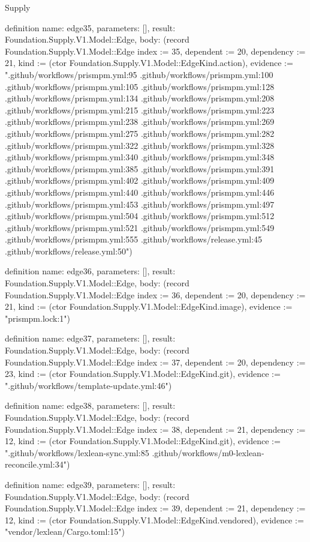 \begin{lexlean}{Supply}
\begin{semanticmodule}
definition{
  name: edge35,
  parameters: [],
  result: Foundation.Supply.V1.Model::Edge,
  body: (record Foundation.Supply.V1.Model::Edge {index := 35, dependent := 20, dependency := 21, kind := (ctor Foundation.Supply.V1.Model::EdgeKind.action), evidence := ".github/workflows/prismpm.yml:95 .github/workflows/prismpm.yml:100 .github/workflows/prismpm.yml:105 .github/workflows/prismpm.yml:128 .github/workflows/prismpm.yml:134 .github/workflows/prismpm.yml:208 .github/workflows/prismpm.yml:215 .github/workflows/prismpm.yml:223 .github/workflows/prismpm.yml:238 .github/workflows/prismpm.yml:269 .github/workflows/prismpm.yml:275 .github/workflows/prismpm.yml:282 .github/workflows/prismpm.yml:322 .github/workflows/prismpm.yml:328 .github/workflows/prismpm.yml:340 .github/workflows/prismpm.yml:348 .github/workflows/prismpm.yml:385 .github/workflows/prismpm.yml:391 .github/workflows/prismpm.yml:402 .github/workflows/prismpm.yml:409 .github/workflows/prismpm.yml:440 .github/workflows/prismpm.yml:446 .github/workflows/prismpm.yml:453 .github/workflows/prismpm.yml:497 .github/workflows/prismpm.yml:504 .github/workflows/prismpm.yml:512 .github/workflows/prismpm.yml:521 .github/workflows/prismpm.yml:549 .github/workflows/prismpm.yml:555 .github/workflows/release.yml:45 .github/workflows/release.yml:50"})
}

definition{
  name: edge36,
  parameters: [],
  result: Foundation.Supply.V1.Model::Edge,
  body: (record Foundation.Supply.V1.Model::Edge {index := 36, dependent := 20, dependency := 21, kind := (ctor Foundation.Supply.V1.Model::EdgeKind.image), evidence := "prismpm.lock:1"})
}

definition{
  name: edge37,
  parameters: [],
  result: Foundation.Supply.V1.Model::Edge,
  body: (record Foundation.Supply.V1.Model::Edge {index := 37, dependent := 20, dependency := 23, kind := (ctor Foundation.Supply.V1.Model::EdgeKind.git), evidence := ".github/workflows/template-update.yml:46"})
}

definition{
  name: edge38,
  parameters: [],
  result: Foundation.Supply.V1.Model::Edge,
  body: (record Foundation.Supply.V1.Model::Edge {index := 38, dependent := 21, dependency := 12, kind := (ctor Foundation.Supply.V1.Model::EdgeKind.git), evidence := ".github/workflows/lexlean-sync.yml:85 .github/workflows/m0-lexlean-reconcile.yml:34"})
}

definition{
  name: edge39,
  parameters: [],
  result: Foundation.Supply.V1.Model::Edge,
  body: (record Foundation.Supply.V1.Model::Edge {index := 39, dependent := 21, dependency := 12, kind := (ctor Foundation.Supply.V1.Model::EdgeKind.vendored), evidence := "vendor/lexlean/Cargo.toml:15"})
}


\end{semanticmodule}
\end{lexlean}
